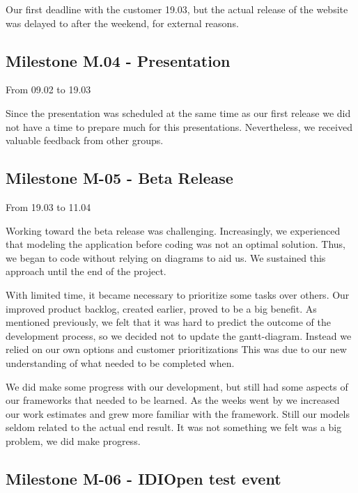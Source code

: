 Our first deadline with the customer 19.03, but the actual release of
the website was delayed to after the weekend, for external reasons. 




\subsection{Milestone M.04 - Presentation}

From 09.02 to 19.03

Since the presentation was scheduled at the same time as our first
release we did not have a time to prepare much for this presentations.
Nevertheless, we received valuable feedback from other groups.




\subsection{Milestone M-05 - Beta Release}

From 19.03 to 11.04

Working toward the beta release was challenging. Increasingly, we
experienced that modeling the application before coding was not an
optimal solution. Thus, we began to code without relying on diagrams to
aid us. We sustained this approach until the end of the project.




With limited time, it became necessary to prioritize some tasks over
others. Our improved product backlog, created earlier, proved to be a
big benefit. As mentioned previously, we felt that it was hard to
predict the outcome of the development process, so we decided not to
update the gantt-diagram. Instead we relied on our own options and
customer prioritizations This was due to our new understanding of what
needed to be completed when.




We did make some progress with our development, but still had some
aspects of our frameworks that needed to be learned. As the weeks went
by we increased our work estimates and grew more familiar with the
framework. Still our models seldom related to the actual end result. It
was not something we felt was a big problem, we did make progress. \ 







\subsection{Milestone M-06 - IDIOpen test event}

